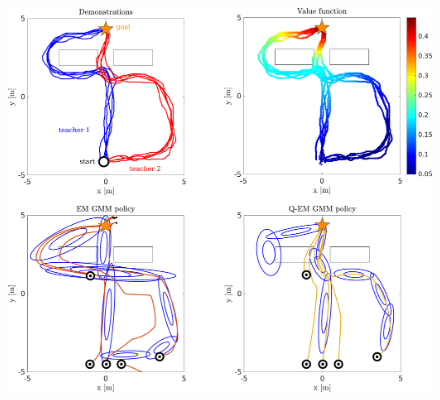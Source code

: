 
\begin{figure}
 \centering
 \setlength\fboxsep{0pt}
  \setlength\fboxrule{0.25pt}
  \includegraphics[width=\textwidth]{./ch4-PiH/Figures/fpe_example.pdf}
 \caption{}
  \label{fig:fpe_example}
\end{figure}


